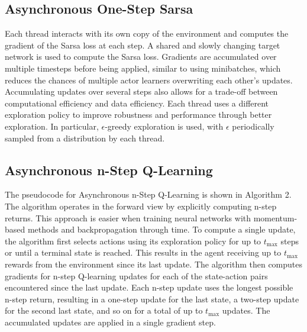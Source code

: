 \documentclass{article}
\begin{document}
\subsection{Asynchronous One-Step Sarsa}
Each thread interacts with its own copy of the environment and computes the gradient of the Sarsa loss at each step. A shared and slowly changing target network is used to compute the Sarsa loss. Gradients are accumulated over multiple timesteps before being applied, similar to using minibatches, which reduces the chances of multiple actor learners overwriting each other’s updates. Accumulating updates over several steps also allows for a trade-off between computational efficiency and data efficiency. Each thread uses a different exploration policy to improve robustness and performance through better exploration. In particular, \(\epsilon\)-greedy exploration is used, with \(\epsilon\) periodically sampled from a distribution by each thread.

\subsection{Asynchronous n-Step Q-Learning}
The pseudocode for Asynchronous n-Step Q-Learning is shown in Algorithm 2. The algorithm operates in the forward view by explicitly computing n-step returns. This approach is easier when training neural networks with momentum-based methods and backpropagation through time. To compute a single update, the algorithm first selects actions using its exploration policy for up to \(t_{\text{max}}\) steps or until a terminal state is reached. This results in the agent receiving up to \(t_{\text{max}}\) rewards from the environment since its last update. The algorithm then computes gradients for n-step Q-learning updates for each of the state-action pairs encountered since the last update. Each n-step update uses the longest possible n-step return, resulting in a one-step update for the last state, a two-step update for the second last state, and so on for a total of up to \(t_{\text{max}}\) updates. The accumulated updates are applied in a single gradient step.
\end{document}
